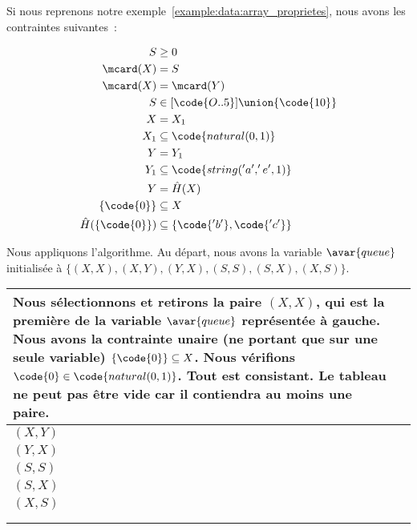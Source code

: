 \begin{example}

Si nous reprenons notre exemple~\ref{example:data:array_proprietes}, nous avons
les contraintes suivantes~:

\begin{align*}
%
S & \geq 0 \\
%
\mcard(X) & = S \\
%
\mcard(X) & = \mcard(Y) \\
%
S & \in [\code{O..5}] \union \{\code{10}\} \\
%
X & = X_1 \\
%
X_1 & \subseteq \code{natural(0, 1)} \\
%
Y & = Y_1 \\
%
Y_1 & \subseteq \code{string('a', 'e', 1)} \\
%
Y & = \hat{H}(X) \\
%
\{\code{0}\} & \subseteq X \\
%
\hat{H}(\{\code{0}\}) & \subseteq \{\code{'b'}, \code{'c'}\} \\
%
\end{align*}

Nous appliquons l'algorithme. Au départ, nous avons la variable $\avar{queue}$
initialisée à $\{(X, X), (X, Y), (Y, X), (S, S), (S, X), (X, S)\}$. 

\noindent
\begin{longtable}{m{}m{}}

Nous sélectionnons et retirons la paire $(X, X)$, qui est la première de la
variable $\avar{queue}$ représentée à gauche. Nous avons la contrainte unaire
(ne portant que sur une seule variable) $\{\code{0}\} \subseteq X$. Nous
vérifions $\code{0} \in \code{natural(0, 1)}$.  Tout est consistant. Le tableau
ne peut pas être vide car il contiendra au moins une paire.
& 
\begin{tabular}{|c|}
\hline
$(X, X)$ \\
\hline
\hline
$(X, Y)$ \\
\hline
$(Y, X)$ \\
\hline
$(S, S)$ \\
\hline
$(S, X)$ \\
\hline
$(X, S)$ \\
\hline
\end{tabular}
\\

\\


\end{longtable}
\end{example}

